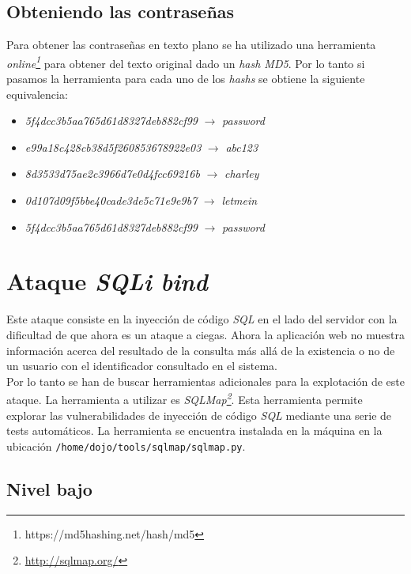 \documentclass{article}
\begin{document}
\subsection{Obteniendo las contraseñas}

Para obtener las contraseñas en texto plano se ha utilizado una herramienta \textit{online\footnote{https://md5hashing.net/hash/md5}} para obtener del texto original dado un \textit{hash MD5}. Por lo tanto si pasamos la herramienta para cada uno de los \textit{hashs} se obtiene la siguiente equivalencia:

\begin{itemize}
    \item \textit{5f4dcc3b5aa765d61d8327deb882cf99} $\rightarrow$ \textit{password}
    \item \textit{e99a18c428cb38d5f260853678922e03} $\rightarrow$ \textit{abc123}
    \item \textit{8d3533d75ae2c3966d7e0d4fcc69216b} $\rightarrow$ \textit{charley}
    \item \textit{0d107d09f5bbe40cade3de5c71e9e9b7} $\rightarrow$ \textit{letmein}
    \item \textit{5f4dcc3b5aa765d61d8327deb882cf99} $\rightarrow$ \textit{password}
\end{itemize}

\newpage

\section{Ataque \textit{SQLi bind}}

Este ataque consiste en la inyección de código \textit{SQL} en el lado del servidor con la dificultad de que ahora es un ataque a ciegas. Ahora la aplicación web no muestra información acerca del resultado de la consulta más allá de la existencia o no de un usuario con el identificador consultado en el sistema.\\
Por lo tanto se han de buscar herramientas adicionales para la explotación de este ataque. La herramienta a utilizar es \textit{SQLMap\footnote{\url{http://sqlmap.org/}}}. Esta herramienta permite explorar las vulnerabilidades de inyección de código \textit{SQL} mediante una serie de tests automáticos. La herramienta se encuentra instalada en la máquina en la ubicación \texttt{/home/dojo/tools/sqlmap/sqlmap.py}.\\


\subsection{Nivel bajo}
\end{document}
